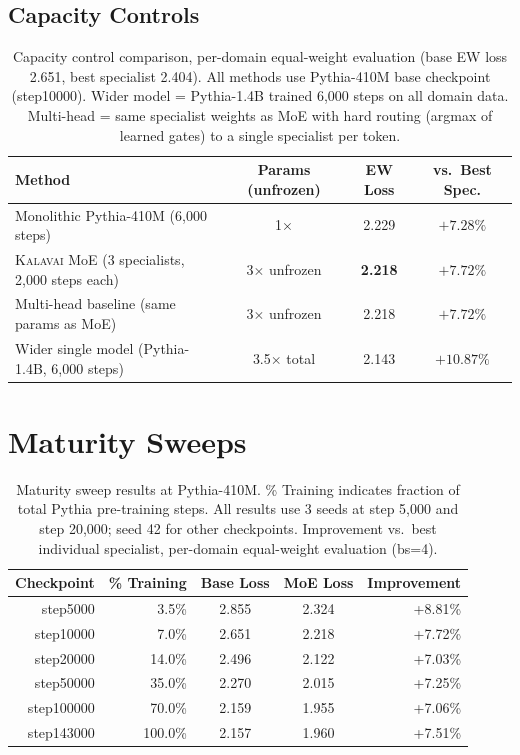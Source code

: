 \documentclass{article}
\newcommand{\kalavai}{\textsc{Kalavai}\xspace}
\begin{document}
\subsection*{Capacity Controls}

\begin{table}[h]
\centering
\caption{Capacity control comparison, per-domain equal-weight evaluation (base EW loss 2.651, best specialist 2.404). All methods use Pythia-410M base checkpoint (step10000). Wider model = Pythia-1.4B trained 6,000 steps on all domain data. Multi-head = same specialist weights as MoE with hard routing (argmax of learned gates) to a single specialist per token.}
\label{tab:capacity}
\begin{tabular}{lccc}
\toprule
\textbf{Method} & \textbf{Params (unfrozen)} & \textbf{EW Loss} & \textbf{vs.\ Best Spec.} \\
\midrule
Monolithic Pythia-410M (6,000 steps)           & 1$\times$         & 2.229 & $+7.28\%$  \\
\kalavai MoE (3 specialists, 2,000 steps each) & 3$\times$ unfrozen & \textbf{2.218} & $\mathbf{+7.72\%}$ \\
Multi-head baseline (same params as MoE)       & 3$\times$ unfrozen & 2.218 & $+7.72\%$  \\
Wider single model (Pythia-1.4B, 6,000 steps)  & 3.5$\times$ total  & 2.143 & $+10.87\%$ \\
\bottomrule
\end{tabular}
\end{table}

\section{Maturity Sweeps}
\label{app:maturity}

\begin{table}[h]
\centering
\caption{Maturity sweep results at Pythia-410M. \% Training indicates fraction of total Pythia pre-training steps. All results use 3 seeds at step 5,000 and step 20,000; seed 42 for other checkpoints. Improvement vs.\ best individual specialist, per-domain equal-weight evaluation (bs=4).}
\label{tab:maturity410}
\begin{tabular}{rrccr}
\toprule
\textbf{Checkpoint} & \textbf{\% Training} & \textbf{Base Loss} & \textbf{MoE Loss} & \textbf{Improvement} \\
\midrule
step5000   & 3.5\%   & 2.855 & 2.324 & +8.81\% \\
step10000  & 7.0\%   & 2.651 & 2.218 & +7.72\% \\
step20000  & 14.0\%  & 2.496 & 2.122 & +7.03\% \\
step50000  & 35.0\%  & 2.270 & 2.015 & +7.25\% \\
step100000 & 70.0\%  & 2.159 & 1.955 & +7.06\% \\
step143000 & 100.0\% & 2.157 & 1.960 & +7.51\% \\
\bottomrule
\end{tabular}
\end{table}
\end{document}
